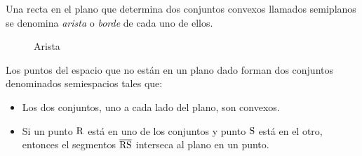 \clearpage

\begin{definition}
    Una recta en el plano que determina dos conjuntos convexos llamados semiplanos se denomina \textit{arista} o \textit{borde} de cada uno de ellos.

    \begin{figure}[!h]
        \centering
        
        \caption{Arista}
        \label{fig:plot26}
    \end{figure}
    
\end{definition}

\begin{postulate}
    Los puntos del espacio que no están en un plano dado forman dos conjuntos denominados semiespacios tales que:

    \begin{itemize}
        \item Los dos conjuntos, uno a cada lado del plano, son convexos.
        \item Si un punto $\rm R$ está en uno de los conjuntos y punto $\rm S$ está en el otro, entonces el segmentos $\overline{\rm RS}$ interseca al plano en un punto.
    \end{itemize}
\end{postulate}
